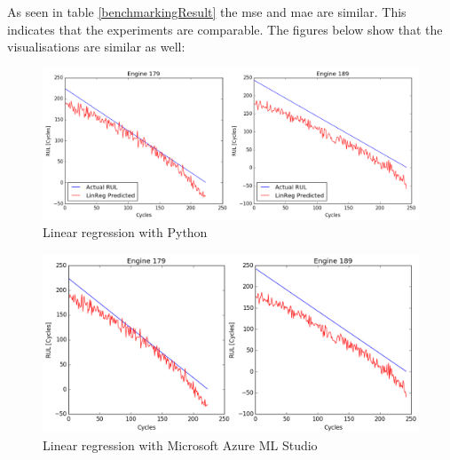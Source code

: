 \documentclass[english, a4paper]{report}
\begin{document}
{{        As seen in table \ref{benchmarkingResult} the \gls{mse} and \gls{mae} are similar. This indicates that the experiments are comparable. The figures below show that the visualisations are similar as well: 
        
        \begin{figure}[H]
            \centering
            \includegraphics[width=\textwidth]{benchmarkingPython}
            \caption{Linear regression with Python}
            \label{fig:benchPython}
        \end{figure}
        
        \begin{figure}[H]
            \centering
            \includegraphics[width=\textwidth]{benchmarkingAzure}
            \caption{Linear regression with Microsoft Azure ML Studio}
            \label{fig:benchAzure}
        \end{figure}
    }
}

\newpage
\end{document}
